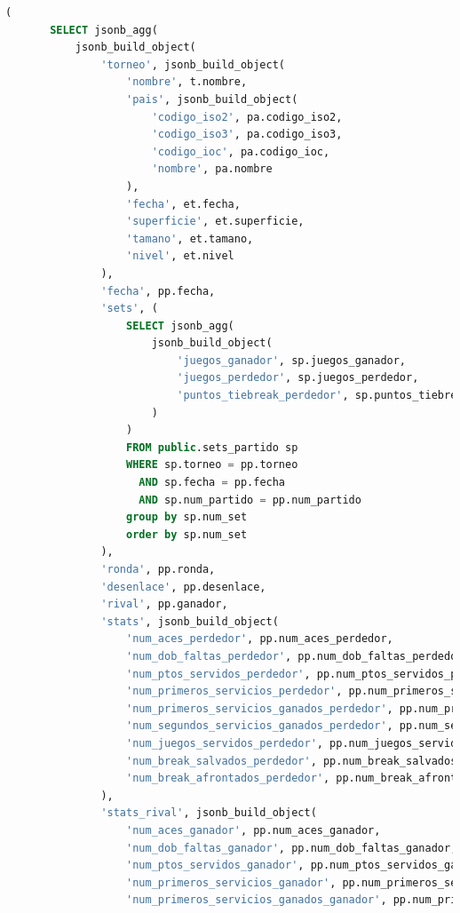 \documentclass[10pt]{opticajnl}
\begin{document}
\begin{lstlisting}[language=SQL]
   (
       SELECT jsonb_agg(
           jsonb_build_object(
               'torneo', jsonb_build_object(
                   'nombre', t.nombre,
                   'pais', jsonb_build_object(
                       'codigo_iso2', pa.codigo_iso2,
                       'codigo_iso3', pa.codigo_iso3,
                       'codigo_ioc', pa.codigo_ioc,
                       'nombre', pa.nombre
                   ),
                   'fecha', et.fecha,
                   'superficie', et.superficie,
                   'tamano', et.tamano,
                   'nivel', et.nivel
               ),
               'fecha', pp.fecha,
               'sets', (
                   SELECT jsonb_agg(
                       jsonb_build_object(
                           'juegos_ganador', sp.juegos_ganador,
                           'juegos_perdedor', sp.juegos_perdedor,
                           'puntos_tiebreak_perdedor', sp.puntos_tiebreak_perdedor
                       )
                   )
                   FROM public.sets_partido sp
                   WHERE sp.torneo = pp.torneo
                     AND sp.fecha = pp.fecha
                     AND sp.num_partido = pp.num_partido
                   group by sp.num_set
                   order by sp.num_set
               ),
               'ronda', pp.ronda,
               'desenlace', pp.desenlace,
               'rival', pp.ganador,
               'stats', jsonb_build_object(
                   'num_aces_perdedor', pp.num_aces_perdedor,
                   'num_dob_faltas_perdedor', pp.num_dob_faltas_perdedor,
                   'num_ptos_servidos_perdedor', pp.num_ptos_servidos_perdedor,
                   'num_primeros_servicios_perdedor', pp.num_primeros_servicios_perdedor,
                   'num_primeros_servicios_ganados_perdedor', pp.num_primeros_servicios_ganados_perdedor,
                   'num_segundos_servicios_ganados_perdedor', pp.num_segundos_servicios_ganados_perdedor,
                   'num_juegos_servidos_perdedor', pp.num_juegos_servidos_perdedor,
                   'num_break_salvados_perdedor', pp.num_break_salvados_perdedor,
                   'num_break_afrontados_perdedor', pp.num_break_afrontados_perdedor
               ),
               'stats_rival', jsonb_build_object(
                   'num_aces_ganador', pp.num_aces_ganador,
                   'num_dob_faltas_ganador', pp.num_dob_faltas_ganador,
                   'num_ptos_servidos_ganador', pp.num_ptos_servidos_ganador,
                   'num_primeros_servicios_ganador', pp.num_primeros_servicios_ganador,
                   'num_primeros_servicios_ganados_ganador', pp.num_primeros_servicios_ganados_ganador,

\end{lstlisting}
\end{document}
